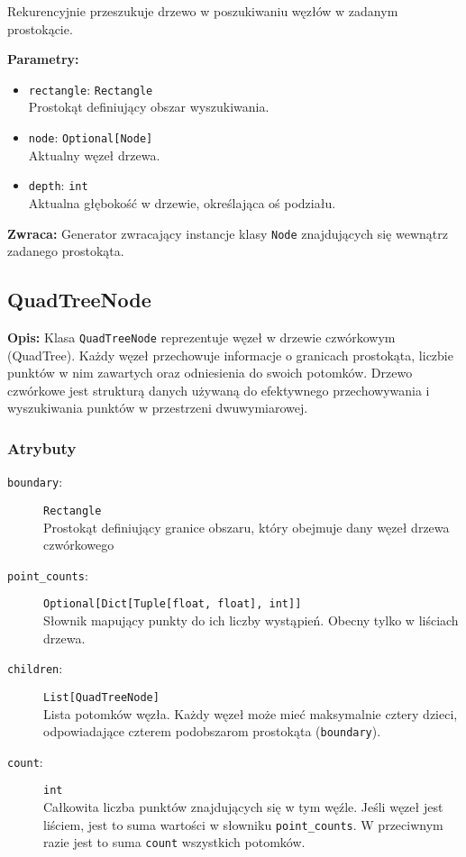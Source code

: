 \documentclass[12pt]{article}
\begin{document}
\noindent Rekurencyjnie przeszukuje drzewo w poszukiwaniu węzłów w zadanym prostokącie.

\noindent\textbf{Parametry:}
\begin{itemize}
    \item \texttt{rectangle}: \texttt{Rectangle} \\
    Prostokąt definiujący obszar wyszukiwania.
    \item \texttt{node}: \texttt{Optional[Node]} \\
    Aktualny węzeł drzewa.
    \item \texttt{depth}: \texttt{int} \\
    Aktualna głębokość w drzewie, określająca oś podziału.
\end{itemize}

\textbf{Zwraca:} 
Generator zwracający instancje klasy \texttt{Node} znajdujących się wewnątrz zadanego prostokąta.

\subsection{QuadTreeNode}

\textbf{Opis:} Klasa \texttt{QuadTreeNode} reprezentuje węzeł w drzewie czwórkowym (QuadTree). Każdy węzeł przechowuje informacje o granicach prostokąta, liczbie punktów w nim zawartych oraz odniesienia do swoich potomków. Drzewo czwórkowe jest strukturą danych używaną do efektywnego przechowywania i wyszukiwania punktów w przestrzeni dwuwymiarowej.

\subsubsection{Atrybuty}

\begin{description}
    \item[\texttt{boundary}:] \texttt{Rectangle} \\
    Prostokąt definiujący granice obszaru, który obejmuje dany węzeł drzewa czwórkowego
    
    \item[\texttt{point\_counts}:] \texttt{Optional[Dict[Tuple[float, float], int]]} \\
    Słownik mapujący punkty do ich liczby wystąpień. Obecny tylko w liściach drzewa.
    
    \item[\texttt{children}:] \texttt{List[QuadTreeNode]} \\
     Lista potomków węzła. Każdy węzeł może mieć maksymalnie cztery dzieci, odpowiadające czterem podobszarom prostokąta (\texttt{boundary}).
    
    \item[\texttt{count}:] \texttt{int} \\
    Całkowita liczba punktów znajdujących się w tym węźle. Jeśli węzeł jest liściem, jest to suma wartości w słowniku \texttt{point\_counts}. W przeciwnym razie jest to suma \texttt{count} wszystkich potomków.
\end{description}
\end{document}
